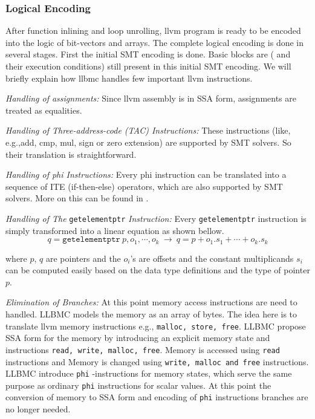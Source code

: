 \documentclass[14pt]{article}
\begin{document}
\subsubsection{Logical Encoding}\label{Logical Encoding}
After function inlining and loop unrolling, llvm program is ready to be encoded into the logic of bit-vectors and arrays. The complete logical encoding is done in several stages. First the initial SMT encoding is done. Basic blocks are ( and their execution conditions) still present in this initial SMT encoding.  We will briefly explain how llbmc handles few important llvm instructions.
\par \textit{Handling of assignments:} Since llvm assembly is in SSA form, assignments are treated as equalities.
\par \textit{Handling of Three-address-code (TAC) Instructions:}  These instructions (like, e.g.,add, cmp, mul, sign or zero extension) are supported by SMT solvers. So their translation is straightforward.
\par \textit{Handling of phi Instructions:} Every phi instruction can be translated into a sequence of ITE (if-then-else) operators, which are also supported by SMT solvers. More on this can be found in \cite{llbmc2}.
\par \textit{Handling of The }\texttt{getelementptr}  \textit{Instruction:} Every \texttt{getelementptr}  instruction is simply transformed into a linear equation as shown bellow.
\[q = \texttt{getelementptr} \  p, o_1, \cdots , o_k \   \rightarrow  \   q = p + o_1 . s_1 + \cdots  + o_k .s_k \] 

where \(p\), \(q\) are pointers and the \(o_i\)'s are offsets and the constant multiplicands \(s_i\) can be computed easily based on the
data type definitions and the type of pointer \(p\).

\par \textit{Elimination of Branches:} At this point memory access instructions are need to handled. LLBMC models the memory as an array of bytes. The idea here is to translate llvm memory instructions e.g.,  \texttt{malloc, store, free}. LLBMC propose SSA form for the memory by introducing an explicit memory state and instructions \texttt{read, write, malloc, free}. Memory is accessed using \texttt{read} instructions and Memory is changed using \texttt{write, malloc and free} instructions. LLBMC introduce \texttt{phi} -instructions for memory states, which serve the same purpose as ordinary \texttt{phi} instructions for scalar values. At this point the conversion of memory to SSA form and  encoding of \texttt{phi} instructions branches are no longer needed.
\end{document}
